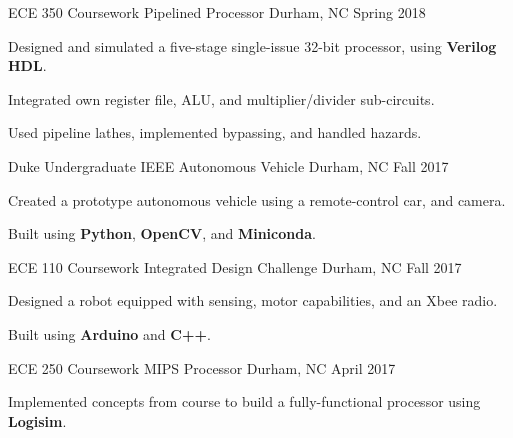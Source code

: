 \begin{cventries}
  \cventry
    {ECE 350 Coursework}
    {Pipelined Processor}
    {Durham, NC}
    {Spring 2018}
    {
       \begin{cvitems}
         \item {Designed and simulated a five-stage single-issue 32-bit processor, using \textbf{Verilog HDL}.}
         \item {Integrated own register file, ALU, and multiplier/divider sub-circuits.}
         \item {Used pipeline lathes, implemented bypassing, and handled hazards.}
       \end{cvitems}
   }
  \cventry
    {Duke Undergraduate IEEE} %
    {Autonomous Vehicle}
    {Durham, NC} %
    {Fall 2017} %
    {
      \begin{cvitems} %
        \item {Created a prototype autonomous vehicle using a remote-control car, and camera.}
        \item {Built using \textbf{Python}, \textbf{OpenCV}, and \textbf{Miniconda}.}
      \end{cvitems}
    }
    \vspace{\acvSectionContentTopSkip}
    \vspace{0.5mm}
  \cventry
    {ECE 110 Coursework}
    {Integrated Design Challenge}
    {Durham, NC}
    {Fall 2017}
    {
      \begin{cvitems}
        \item {Designed a robot equipped with sensing, motor capabilities, and an Xbee radio.}
        \item {Built using \textbf{Arduino} and \textbf{C++}.}
      \end{cvitems}
    }
    \vspace{\acvSectionContentTopSkip}
    \vspace{0.5mm}
  \cventry
    {ECE 250 Coursework} %
    {MIPS Processor}
    {Durham, NC} %
    {April 2017} %
    {
      \begin{cvitems} %
        \item {Implemented concepts from course to build a fully-functional processor using \textbf{Logisim}.}
      \end{cvitems}
    }
\end{cventries}

